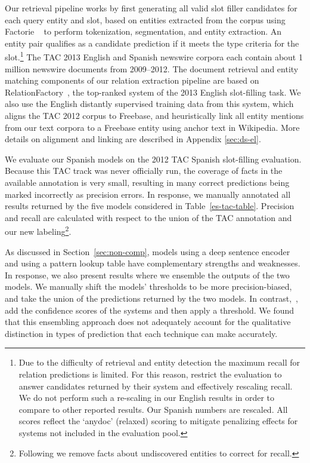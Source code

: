 Our retrieval pipeline works by first generating all valid slot filler candidates for each query entity and slot, based on entities extracted from the corpus using {\sc Factorie} ~\citep{mccallum09:factorie:} to perform tokenization, segmentation, and entity extraction. 
An entity pair qualifies as a candidate prediction if it meets the type criteria for the slot.\footnote{Due to the difficulty of retrieval and entity detection the maximum recall for relation predictions is limited. For this reason, \citet{surdeanu2012multi} restrict the evaluation to answer candidates returned by their system and effectively rescaling recall. We do not perform such a re-scaling in our English results in order to compare to other reported results. Our Spanish numbers are rescaled. All scores reflect the `anydoc' (relaxed) scoring to mitigate penalizing effects for systems not included in the evaluation pool.} The TAC 2013 English and Spanish newswire corpora each contain about 1 million newswire documents from 2009--2012. The document retrieval and entity matching components of our relation extraction pipeline are based on RelationFactory~\citep{roth2014relationfactory}, the top-ranked system of the 2013 English slot-filling task. We also use the English distantly supervised training data from this system, which aligns the TAC 2012 corpus to Freebase, and heuristically link all entity mentions from our text corpora to a Freebase entity using anchor text in Wikipedia. More details on alignment and linking are described in Appendix \ref{sec:ds-el}.


We evaluate our Spanish models on the 2012 TAC Spanish slot-filling evaluation. Because this TAC track was never officially run, the coverage of facts in the available annotation is very small, resulting in many correct predictions being marked incorrectly as precision errors. In response, we manually annotated all results returned by the five models considered in Table~\ref{es-tac-table}. Precision and recall are calculated with respect to the union of the TAC annotation and our new labeling\footnote{Following \citet{surdeanu2012multi} we remove facts about undiscovered entities to correct for recall.}.

As discussed in Section~\ref{sec:non-comp}, models using a deep sentence encoder and using a pattern lookup table have complementary strengths and weaknesses. In response, we also present results where we ensemble the outputs of the two models.  We manually shift the models' thresholds to be more precision-biased, and take the union of the predictions returned by the two models. In contrast,~\citet{toutanova2015representing}, add the confidence scores of the systems and then apply a threshold. We found that this ensembling approach does not adequately account for the qualitative distinction in types of prediction that each technique can make accurately. 


